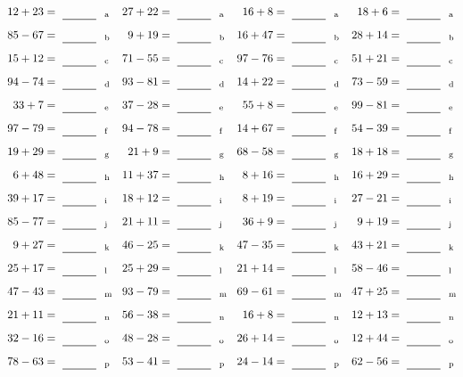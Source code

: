 \documentclass
[
  draft    = true,
  fontsize = 11pt,
  parskip  = half-
]
{scrartcl}
\begin{document}
\clearpage
\begin{align*}
    \pline{12+23}&=\rline{a}
  & \pline{27+22}&=\rline{a}
  & \pline{16+8}&=\rline{a}
  & \pline{18+6}&=\rline{a} \\[1ex]
    \pline{85-67}&=\rline{b}
  & \pline{9+19}&=\rline{b}
  & \pline{16+47}&=\rline{b}
  & \pline{28+14}&=\rline{b} \\[1ex]
    \pline{15+12}&=\rline{c}
  & \pline{71-55}&=\rline{c}
  & \pline{97-76}&=\rline{c}
  & \pline{51+21}&=\rline{c} \\[1ex]
    \pline{94-74}&=\rline{d}
  & \pline{93-81}&=\rline{d}
  & \pline{14+22}&=\rline{d}
  & \pline{73-59}&=\rline{d} \\[1ex]
    \pline{33+7}&=\rline{e}
  & \pline{37-28}&=\rline{e}
  & \pline{55+8}&=\rline{e}
  & \pline{99-81}&=\rline{e} \\[1ex]
    \pline{97-79}&=\rline{f}
  & \pline{94-78}&=\rline{f}
  & \pline{14+67}&=\rline{f}
  & \pline{54-39}&=\rline{f} \\[1ex]
    \pline{19+29}&=\rline{g}
  & \pline{21+9}&=\rline{g}
  & \pline{68-58}&=\rline{g}
  & \pline{18+18}&=\rline{g} \\[1ex]
    \pline{6+48}&=\rline{h}
  & \pline{11+37}&=\rline{h}
  & \pline{8+16}&=\rline{h}
  & \pline{16+29}&=\rline{h} \\[1ex]
    \pline{39+17}&=\rline{i}
  & \pline{18+12}&=\rline{i}
  & \pline{8+19}&=\rline{i}
  & \pline{27-21}&=\rline{i} \\[1ex]
    \pline{85-77}&=\rline{j}
  & \pline{21+11}&=\rline{j}
  & \pline{36+9}&=\rline{j}
  & \pline{9+19}&=\rline{j} \\[1ex]
    \pline{9+27}&=\rline{k}
  & \pline{46-25}&=\rline{k}
  & \pline{47-35}&=\rline{k}
  & \pline{43+21}&=\rline{k} \\[1ex]
    \pline{25+17}&=\rline{l}
  & \pline{25+29}&=\rline{l}
  & \pline{21+14}&=\rline{l}
  & \pline{58-46}&=\rline{l} \\[1ex]
    \pline{47-43}&=\rline{m}
  & \pline{93-79}&=\rline{m}
  & \pline{69-61}&=\rline{m}
  & \pline{47+25}&=\rline{m} \\[1ex]
    \pline{21+11}&=\rline{n}
  & \pline{56-38}&=\rline{n}
  & \pline{16+8}&=\rline{n}
  & \pline{12+13}&=\rline{n} \\[1ex]
    \pline{32-16}&=\rline{o}
  & \pline{48-28}&=\rline{o}
  & \pline{26+14}&=\rline{o}
  & \pline{12+44}&=\rline{o} \\[1ex]
    \pline{78-63}&=\rline{p}
  & \pline{53-41}&=\rline{p}
  & \pline{24-14}&=\rline{p}
  & \pline{62-56}&=\rline{p}
\end{align*}
\end{document}

